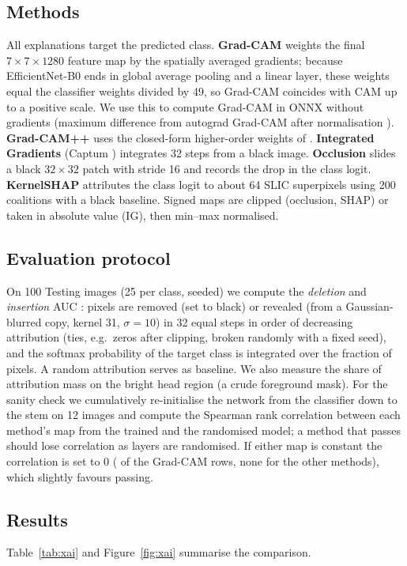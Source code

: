 \documentclass[11pt,a4paper]{article}
\begin{document}
\subsection{Methods}
All explanations target the predicted class. \textbf{Grad-CAM} weights the final $7\times7\times1280$ feature map by the spatially averaged gradients; because EfficientNet-B0 ends in global average pooling and a linear layer, these weights equal the classifier weights divided by 49, so Grad-CAM coincides with CAM up to a positive scale. We use this to compute Grad-CAM in ONNX without gradients (maximum difference from autograd Grad-CAM after normalisation \CamDiff{}). \textbf{Grad-CAM++} uses the closed-form higher-order weights of \citet{chattopadhay2018}. \textbf{Integrated Gradients} (Captum \citep{kokhlikyan2020}) integrates 32 steps from a black image. \textbf{Occlusion} slides a black $32\times32$ patch with stride 16 and records the drop in the class logit. \textbf{KernelSHAP} \citep{lundberg2017} attributes the class logit to about 64 SLIC superpixels \citep{achanta2012} using 200 coalitions with a black baseline. Signed maps are clipped (occlusion, SHAP) or taken in absolute value (IG), then min--max normalised.

\subsection{Evaluation protocol}
On 100 Testing images (25 per class, seeded) we compute the \emph{deletion} and \emph{insertion} AUC \citep{petsiuk2018}: pixels are removed (set to black) or revealed (from a Gaussian-blurred copy, kernel 31, $\sigma=10$) in 32 equal steps in order of decreasing attribution (ties, e.g.\ zeros after clipping, broken randomly with a fixed seed), and the softmax probability of the target class is integrated over the fraction of pixels. A random attribution serves as baseline. We also measure the share of attribution mass on the bright head region (a crude foreground mask). For the sanity check \citep{adebayo2018} we cumulatively re-initialise the network from the classifier down to the stem on 12 images and compute the Spearman rank correlation between each method's map from the trained and the randomised model; a method that passes should lose correlation as layers are randomised. If either map is constant the correlation is set to 0 (\SanConstGc{} of the \SanRowsGc{} Grad-CAM rows, none for the other methods), which slightly favours passing.

\subsection{Results}
Table~\ref{tab:xai} and Figure~\ref{fig:xai} summarise the comparison.
\end{document}
